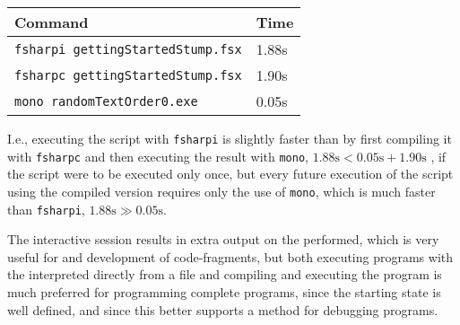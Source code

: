 \begin{center}
  \begin{tabular}{|l|l|}
    \hline
    Command & Time\\
    \hline
    \verb|fsharpi gettingStartedStump.fsx| & 1.88s\\
    \verb|fsharpc gettingStartedStump.fsx| & 1.90s\\
    \verb|mono randomTextOrder0.exe| & 0.05s\\
    \hline
\end{tabular}
\end{center}
I.e., executing the script with \verb|fsharpi| is slightly faster than by first compiling it with \verb|fsharpc| and then executing the result with \verb|mono|, $1.88\text{s} < 0.05\text{s}+1.90\text{s}$ , if the script were to be executed only once, but every future execution of the script using the compiled version requires only the use of \verb|mono|, which is much faster than \verb|fsharpi|, $1.88\text{s}\gg 0.05\text{s}$.


The interactive session results in extra output on the  performed, which is very useful for  and development of code-fragments, but both executing programs with the interpreted directly from a file and compiling and executing the program is much preferred for programming complete programs, since the starting state is well defined, and since this better supports  a method for debugging programs.

\begin{comment}
  \section{Behind the scene}
  \jon{I'm not sure, whether it will be a good idea to describe this. Could be used as the umbrella for the specifikation of the program.} When a program is compiled or interpreted the following steps are performed by the system
  \begin{enumerate}
  \item Decoding
  \item Tokenization
  \item Lexical Filtering
  \item Parsing
  \item Importing
  \item Checking
  \item Elaboration
  \item Execution
  \end{enumerate}
\end{comment}

